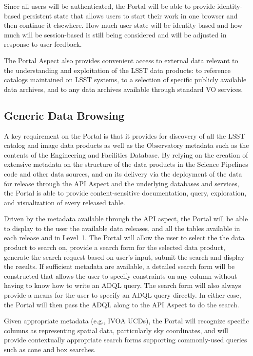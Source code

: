 Since all users will be authenticated, the Portal will be able to provide identity-based persistent state that allows users to start their work in one browser and then continue it elsewhere.
How much user state will be identity-based and how much will be session-based is still being considered and will be adjusted in response to user feedback.

The Portal Aspect also provides convenient access to external data relevant to the understanding and exploitation of the LSST data products: 
to reference catalogs maintained on LSST systems,
to a selection of specific publicly available data archives,
and to any data archives available through standard VO services.

\subsection{Generic Data Browsing}\label{generic-data-browsing}

A key requirement on the Portal is that it provides for discovery of all the LSST catalog and image data products as well as the Observatory metadata such as the contents of the Engineering and Facilities Database.
By relying on the creation of extensive metadata on the structure of the data products in the Science Pipelines code and other data sources, and on its delivery via the deployment of the data for release through the API Aspect and the underlying databases and services, the Portal is able to provide content-sensitive documentation, query, exploration, and visualization of every released table.

Driven by the metadata available through the API aspect, the Portal will be able to display to the user the available data releases, and all the tables available in each release and in Level~1.
The Portal will allow the user to select the the data product to search on, provide a search form for the selected data product, generate the search request based on user's input, submit the search and display the results. 
If sufficient metadata are available, a detailed search form will be constructed that allows the user to specify constraints on any column without having to know how to write an ADQL query.
The search form will also always provide a means for the user to specify an ADQL query directly.
In either case, the Portal will then pass the ADQL along to the API Aspect to do the search.

Given appropriate metadata (e.g., IVOA UCDs), the Portal will recognize specific columns as representing spatial data, particularly sky coordinates, and will provide contextually appropriate search forms supporting commonly-used queries such as cone and box searches.

